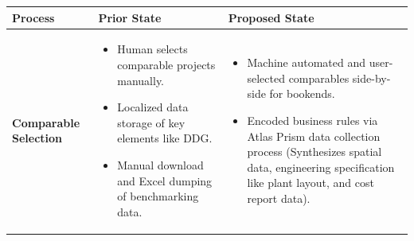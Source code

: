 \documentclass[12pt, a4paper]{article} %
\begin{document}
\begin{table}[h!]
\centering
\renewcommand{\arraystretch}{1.3}
\begin{tabularx}{\textwidth}{@{}
  >{\raggedright\arraybackslash\relax}p{2.5cm}
  X 
  X
@{}}
\toprule
\textbf{Process} & \textbf{Prior State} & \textbf{Proposed State} \\
\midrule

\textbf{Comparable Selection} &
\vspace*{-\topsep}\vspace{\parskip}
\begin{itemize}[leftmargin=*, nosep]
  \item Human selects comparable projects manually.
  \item Localized data storage of key elements like DDG.
  \item Manual download and Excel dumping of benchmarking data.
\end{itemize}
\vspace*{-\topsep}\vspace{\parskip}
&
\vspace*{-\topsep}\vspace{\parskip}
\begin{itemize}[leftmargin=*, nosep]
  \item Machine automated and user-selected comparables side-by-side for bookends.
  \item Encoded business rules via Atlas Prism data collection process (Synthesizes spatial data, engineering specification like plant layout, and cost report data).
\end{itemize} 
\vspace*{-\topsep}\vspace{\parskip}\\

\midrule


\end{tabularx}
\end{table}
\end{document}
